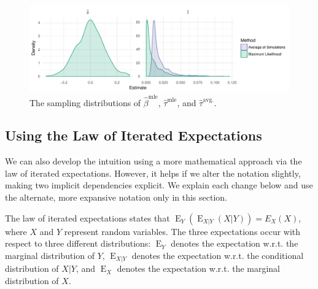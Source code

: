 \documentclass[10pt]{article}
\DeclareMathOperator*{\E}{\text{E}}
\begin{document}
\begin{figure}[h]
\begin{center}
\includegraphics[scale = 0.6]{figs/intuition-sampling.pdf}
\caption{The sampling distributions of $\hat{\beta}^\text{mle}$, $\hat{\tau}^\text{mle}$, and $\hat{\tau}^\text{avg.}$.}\label{fig:int-samp}
\end{center}
\end{figure}

\subsection*{Using the Law of Iterated Expectations}

We can also develop the intuition using a more mathematical approach via the law of iterated expectations. 
However, it helps if we alter the notation slightly, making two implicit dependencies explicit. 
We explain each change below and use the alternate, more expansive notation only in this section.
 
The law of iterated expectations states that $\E_Y \left( \E_{X|Y}(X | Y) \right) = E_X(X)$, where $X$ and $Y$ represent random variables. 
The three expectations occur with respect to three different distributions: $\E_Y$ denotes the expectation w.r.t. the marginal distribution of $Y$, $\E_{X|Y}$ denotes the expectation w.r.t. the conditional distribution of $X | Y$, and $\E_X$ denotes the expectation w.r.t. the marginal distribution of $X$. 
\end{document}
